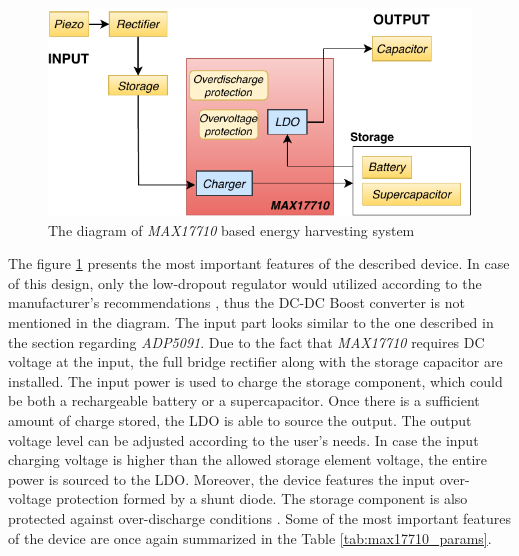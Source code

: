 \documentclass[12pt,a4paper]{article}
\begin{document}
\begin{figure}[ht!]
\includegraphics[scale=1.05]{MAX17710.pdf}
\caption{The diagram of \textit{MAX17710} based energy harvesting system}
\label{fig:max17710diagram}
\end{figure}

The figure \ref{fig:max17710diagram} presents the most important features of the described device. In case of this design, only the low-dropout regulator would utilized according to the manufacturer's recommendations \cite{max17710_params}, thus the DC-DC Boost converter is not mentioned in the diagram. The input part looks similar to the one described in the section regarding \textit{ADP5091}. Due to the fact that \textit{MAX17710} requires DC voltage at the input, the full bridge rectifier  along with the storage capacitor are installed. The input power is used to charge the storage component, which could be both a rechargeable battery or a supercapacitor. Once there is a sufficient amount of charge stored, the LDO is able to source the output. The output voltage level can be adjusted according to the user's needs. In case the input charging voltage is higher than the allowed storage element voltage, the entire power is sourced to the LDO. Moreover, the device features the input over-voltage protection formed by a shunt diode. The storage component is also protected against over-discharge conditions \cite{max17710_params}. Some of the most important features  of the device are once again summarized in the Table \ref{tab:max17710_params}.
\end{document}
